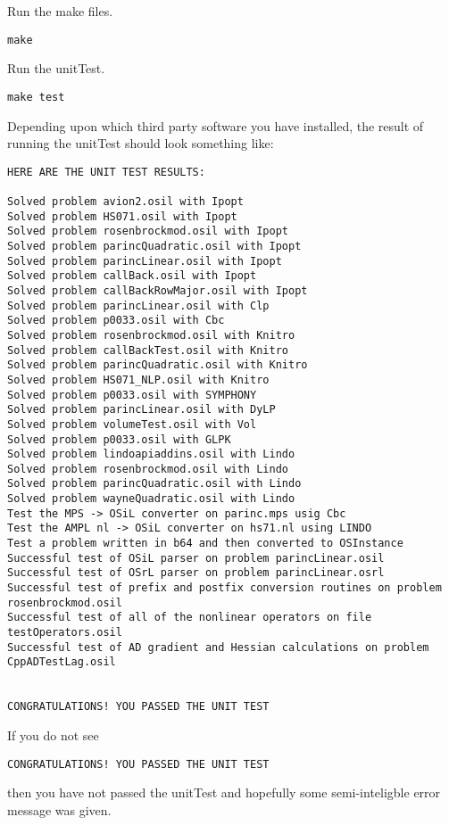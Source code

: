 \documentclass[11pt]{article}
\renewcommand{\_}{{\char"5F}}
\renewcommand{\{}{{\char"7B}}
\renewcommand{\}}{{\char"7D}}
\renewcommand{\^}{{\char"0D}}
\renewcommand{\'}{{\char"0D}}
\begin{document}
  Run the make files.

\begin{verbatim}
make
\end{verbatim}

 Run the unitTest.

\begin{verbatim}
make test
\end{verbatim}

Depending upon which third party software you have installed, the result of running the unitTest should look something like:


{\small
\begin{verbatim}
HERE ARE THE UNIT TEST RESULTS:

Solved problem avion2.osil with Ipopt
Solved problem HS071.osil with Ipopt
Solved problem rosenbrockmod.osil with Ipopt
Solved problem parincQuadratic.osil with Ipopt
Solved problem parincLinear.osil with Ipopt
Solved problem callBack.osil with Ipopt
Solved problem callBackRowMajor.osil with Ipopt
Solved problem parincLinear.osil with Clp
Solved problem p0033.osil with Cbc
Solved problem rosenbrockmod.osil with Knitro
Solved problem callBackTest.osil with Knitro
Solved problem parincQuadratic.osil with Knitro
Solved problem HS071_NLP.osil with Knitro
Solved problem p0033.osil with SYMPHONY
Solved problem parincLinear.osil with DyLP
Solved problem volumeTest.osil with Vol
Solved problem p0033.osil with GLPK
Solved problem lindoapiaddins.osil with Lindo
Solved problem rosenbrockmod.osil with Lindo
Solved problem parincQuadratic.osil with Lindo
Solved problem wayneQuadratic.osil with Lindo
Test the MPS -> OSiL converter on parinc.mps usig Cbc
Test the AMPL nl -> OSiL converter on hs71.nl using LINDO
Test a problem written in b64 and then converted to OSInstance
Successful test of OSiL parser on problem parincLinear.osil
Successful test of OSrL parser on problem parincLinear.osrl
Successful test of prefix and postfix conversion routines on problem rosenbrockmod.osil
Successful test of all of the nonlinear operators on file testOperators.osil
Successful test of AD gradient and Hessian calculations on problem CppADTestLag.osil


CONGRATULATIONS! YOU PASSED THE UNIT TEST
\end{verbatim}
}

If you do not see
\begin{verbatim}
CONGRATULATIONS! YOU PASSED THE UNIT TEST
\end{verbatim}
then you have not passed the unitTest and hopefully some semi-inteligble error message was given. 
\end{document}
